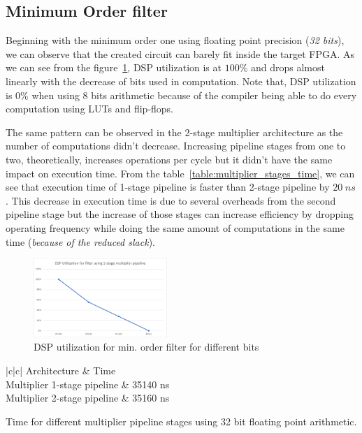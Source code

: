 \subsection{Minimum Order filter}
Beginning with the minimum order one using floating point precision (\textit{32 bits}), we can observe that the created circuit can barely fit inside the target FPGA. As we can see from the figure~\ref{fig:fir_min_dsp_util}, DSP utilization is at $100\%$ and drops almost linearly with the decrease of bits used in computation. Note that, DSP utilization is $0\%$ when using 8 bits arithmetic because of the compiler being able to do every computation using LUTs and flip-flops.

The same pattern can be observed in the 2-stage multiplier architecture as the number of computations didn't decrease. Increasing pipeline stages from one to two, theoretically, increases operations per cycle but it didn't have the same impact on execution time. From the table~\ref{table:multiplier_stages_time}, we can see that execution time of 1-stage pipeline is faster than 2-stage pipeline by $20\hspace{3pt}ns$. This decrease in execution time is due to several overheads from the second pipeline stage but the increase of those stages can increase efficiency by dropping operating frequency while doing the same amount of computations in the same time (\textit{because of the reduced slack}).

\begin{figure}[htbp]
	\centering
	\includegraphics[width=0.45\textwidth]{../Images/FIR_min_Order/multiplier_1_pipeline/dsp_util.png}
	\caption{DSP utilization for min. order filter for different bits}
	\label{fig:fir_min_dsp_util}
\end{figure}

\begin{table}[htbp]
\centering
\begin{tblr}{|c|c|}
	\hline
	Architecture & Time \\
	\hline
	{Multiplier 1-stage pipeline} & 35140 ns\\
	\hline
	{Multiplier 2-stage pipeline} & 35160 ns\\
	\hline
\end{tblr}
\caption{Time for different multiplier pipeline stages using 32 bit floating point arithmetic.}
\label{table:multiplier_stages_time}
\end{table}

